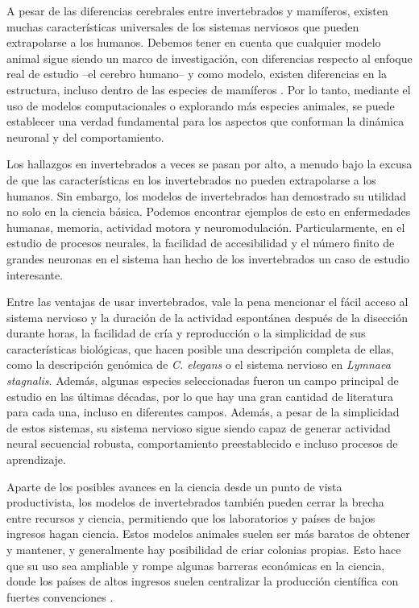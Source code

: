 A pesar de las diferencias cerebrales entre invertebrados y mamíferos, existen muchas características universales de los sistemas nerviosos que pueden extrapolarse a los humanos. Debemos tener en cuenta que cualquier modelo animal sigue siendo un marco de investigación, con diferencias respecto al enfoque real de estudio --el cerebro humano-- y como modelo, existen diferencias en la estructura, incluso dentro de las especies de mamíferos \parencite{preuss_taking_2000}. Por lo tanto, mediante el uso de modelos computacionales o explorando más especies animales, se puede establecer una verdad fundamental para los aspectos que conforman la dinámica neuronal y del comportamiento.

Los hallazgos en invertebrados a veces se pasan por alto, a menudo bajo la excusa de que las características en los invertebrados no pueden extrapolarse a los humanos. Sin embargo, los modelos de invertebrados han demostrado su utilidad no solo en la ciencia básica. Podemos encontrar ejemplos de esto en enfermedades humanas, memoria, actividad motora y neuromodulación. Particularmente, en el estudio de procesos neurales, la facilidad de accesibilidad y el número finito de grandes neuronas en el sistema han hecho de los invertebrados un caso de estudio interesante.

Entre las ventajas de usar invertebrados, vale la pena mencionar el fácil acceso al sistema nervioso y la duración de la actividad espontánea después de la disección durante horas, la facilidad de cría y reproducción o la simplicidad de sus características biológicas, que hacen posible una descripción completa de ellas, como la descripción genómica de \textit{C. elegans} o el sistema nervioso en \textit{Lymnaea stagnalis}. Además, algunas especies seleccionadas fueron un campo principal de estudio en las últimas décadas, por lo que hay una gran cantidad de literatura para cada una, incluso en diferentes campos. Además, a pesar de la simplicidad de estos sistemas, su sistema nervioso sigue siendo capaz de generar actividad neural secuencial robusta, comportamiento preestablecido e incluso procesos de aprendizaje.

Aparte de los posibles avances en la ciencia desde un punto de vista productivista, los modelos de invertebrados también pueden cerrar la brecha entre recursos y ciencia, permitiendo que los laboratorios y países de bajos ingresos hagan ciencia. Estos modelos animales suelen ser más baratos de obtener y mantener, y generalmente hay posibilidad de criar colonias propias. Esto hace que su uso sea ampliable y rompe algunas barreras económicas en la ciencia, donde los países de altos ingresos suelen centralizar la producción científica con fuertes convenciones \parencite{castillo_spineless_2017,stephan_how_2015}.

